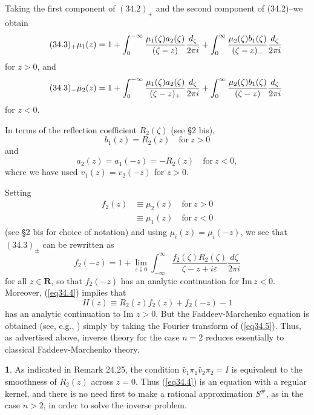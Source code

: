 \documentclass{surv-l}
\theoremstyle{plain}
\theoremstyle{definition}
\newtheorem{remark}[theorem]{\sc{Remark}}
\numberwithin{equation}{chapter}
\begin{document}
Taking the first component of $(34.2)_{+}$ and the second component
of (34.2)--we obtain
\begin{equation*}
\tag*{$(34.3)_{+}$}\mu_{1}(z)=1+\int_{0}^{-\infty}\frac{\mu_{1}(\zeta)a_{2}(\zeta)}{(\zeta-z)}\frac{d_{\zeta}}{2\pi i}+\int_{0}^{\infty}\frac{\mu_{2}(\zeta)b_{1}(\zeta)}{(\zeta-z)_{-}}\frac{d_{\zeta}}{2\pi i}
\end{equation*}
for $z>0$, and
\begin{equation*}
\tag*{$(34.3)_{-}$}\mu_{2}(z)=1+\int_{0}^{-\infty}\frac{\mu_{1}(\zeta)a_{2}(\zeta)}{(\zeta-z)_{+}}\frac{d_{\zeta}}{2\pi i}+\int_{0}^{\infty}\frac{\mu_{2}(\zeta)b_{1}(\zeta)}{(\zeta-z)}\frac{d_{\zeta}}{2\pi i}
\end{equation*}
for $z<0$.

In terms of the reflection coefficient $R_{2}(\zeta)$ (see \S 2 bis),
\begin{equation*}
b_{1}(z)=R_{2}(z)\quad \mathrm{for}\ z>0
\end{equation*}
and
\begin{equation*}
a_{2}(z)=a_{1}(-z)=-R_{2}(z)\quad \mathrm{for}\ z<0,
\end{equation*}
where we have used $v_{1}(z)=v_{2}(-z)$ for $z>0$.

Setting
\begin{align*}
f_{2}(z)&\equiv\mu_{2}(z)\quad \mathrm{for}\ z>0\\
&\equiv\mu_{1}(z)\quad \mathrm{for}\ z<0
\end{align*}
(see \S 2 bis for choice of notation) and using $\mu_{i}(z)=\mu_{i}(-z)$, we see that $(34.3)_{\pm}$ can be rewritten as
\setcounter{equation}{3}
\begin{equation}\label{eq34.4}
f_{2}(-z)=1+\lim_{\varepsilon\downarrow 0}\int_{-\infty}^{\infty}\frac{f_{2}(\zeta)R_{2}(\zeta)}{\zeta-z+i\varepsilon}\frac{d\zeta}{2\pi i}
\end{equation}
for all $z\in \mathbf{R}$, so that $f_{2}(-z)$ has an analytic continuation for $\mathrm{Im}\,z<0$. Moreover, (\ref{eq34.4}) implies that
\begin{equation}\label{eq34.5}
H(z)\equiv R_{2}(z)f_{2}(z)+f_{2}(-z)-1
\end{equation}
has an analytic continuation to Im $z>0$. But the Faddeev-Marchenko equation is obtained (see, e.g., \cite{DT}) simply by taking the Fourier transform of (\ref{eq34.5}). Thus, as advertised above, inverse theory for the case $n=2$ reduces essentially to classical Faddeev-Marchenko theory.
\setcounter{theorem}{5}
\begin{remark}\label{eq34.6}
As indicated in Remark 24.25, the condition $\hat{v}_{1}\pi_{1}\hat{v}_{2}\pi_{2}=I$ is equivalent to the smoothness of $R_{2}(z)$ across $z=0$. Thus (\ref{eq34.4}) is an equation with a regular kernel, and there is no need first to make a rational approximation $S^{\#}$, as in the case $n>2$, in order to solve the inverse problem.
\end{remark}
\end{document}
